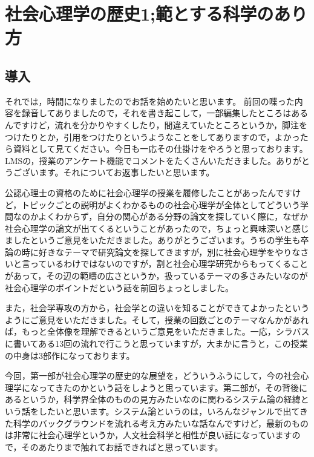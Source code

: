 \documentclass{ltjsbook}
\begin{document}
\setcounter{chapter}{1}
\chapter{社会心理学の歴史1;範とする科学のあり方}
\label{sp02_science}

\section{導入}

それでは，時間になりましたのでお話を始めたいと思います。
前回の喋った内容を録音してありましたので，それを書き起こして，一部編集したところはあるんですけど，流れを分かりやすくしたり，間違えていたところというか，脚注をつけたりとか，引用をつけたりというようなことをしてありますので，よかったら資料として見てください。今日も一応その仕掛けをやろうと思っております。
LMSの，授業のアンケート機能でコメントをたくさんいただきました。ありがとうございます。それについてお返事したいと思います。

公認心理士の資格のために社会心理学の授業を履修したことがあったんですけど，トピックごとの説明がよくわかるものの社会心理学が全体としてどういう学問なのかよくわからず，自分の関心がある分野の論文を探していく際に，なぜか社会心理学の論文が出てくるということがあったので，ちょっと興味深いと感じましたというご意見をいただきました。ありがとうございます。うちの学生も卒論の時に好きなテーマで研究論文を探してきますが，別に社会心理学をやりなさいと言っているわけではないのですが，割と社会心理学研究からもってくることがあって，その辺の範疇の広さというか，扱っているテーマの多さみたいなのが社会心理学のポイントだという話を前回ちょっとしました。

また，社会学専攻の方から，社会学との違いを知ることができてよかったというようにご意見をいただきました。そして，授業の回数ごとのテーマなんかがあれば，もっと全体像を理解できるというご意見をいただきました。一応，シラバスに書いてある13回の流れで行こうと思っていますが，大まかに言うと，この授業の中身は3部作になっております。

今回，第一部が社会心理学の歴史的な展望を，どういうふうにして，今の社会心理学になってきたのかという話をしようと思っています。第二部が，その背後にあるというか，科学界全体のものの見方みたいなのに関わるシステム論の経緯という話をしたいと思います。システム論というのは，いろんなジャンルで出てきた科学のバックグラウンドを流れる考え方みたいな話なんですけど，最新のものは非常に社会心理学というか，人文社会科学と相性が良い話になっていますので，そのあたりまで触れてお話できればと思っています。
\end{document}
